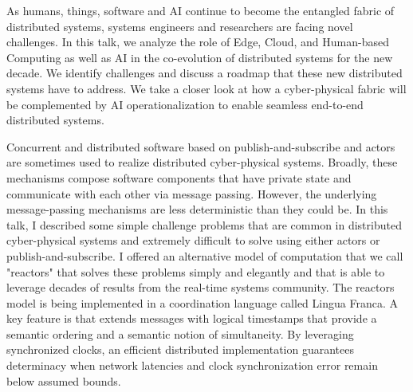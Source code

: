 \documentclass[a4paper,UKenglish]{dagrep-v2018}
\begin{document}
\license

As humans, things, software and AI continue to become the entangled fabric of distributed systems, systems engineers and researchers are facing novel challenges. In this talk, we analyze the role of Edge, Cloud, and Human-based Computing as well as AI in the co-evolution of distributed systems for the new decade. We identify challenges and discuss a roadmap that these new distributed systems have to address. We take a closer look at how a cyber-physical fabric will be complemented by AI operationalization to enable seamless end-to-end distributed systems.


\license

Concurrent and distributed software based on publish-and-subscribe and actors are sometimes used to realize distributed cyber-physical systems. Broadly, these mechanisms compose software components that have private state and communicate with each other via message passing. However, the underlying message-passing mechanisms are less deterministic than they could be. In this talk, I described some simple challenge problems that are common in distributed cyber-physical systems and extremely difficult to solve using either actors or publish-and-subscribe. I  offered an alternative model of computation that we call "reactors" that solves these problems simply and elegantly and that is able to leverage decades of results from the real-time systems community. The reactors model is being implemented in a coordination language called Lingua Franca. A key feature is that extends messages with logical timestamps that provide a semantic ordering and a semantic notion of simultaneity. By leveraging synchronized clocks, an efficient distributed implementation guarantees determinacy when network latencies and clock synchronization error remain below assumed bounds.


\license
\end{document}

